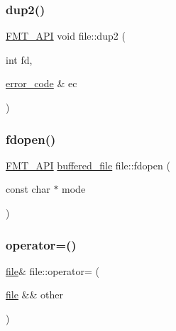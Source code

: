 \mbox{\label{classfile_afcd00b59adb3e06540627960832a164c}} 
\subsubsection{\texorpdfstring{dup2()}{dup2()}\hspace{0.1cm}{\footnotesize\ttfamily [2/2]}}
{\footnotesize\ttfamily \hyperlink{core_8h_a9a4960b70582ed2620911a0b75dce0b5}{F\+M\+T\+\_\+\+A\+PI} void file\+::dup2 (\begin{DoxyParamCaption}\item[{int}]{fd,  }\item[{\hyperlink{classerror__code}{error\+\_\+code} \&}]{ec }\end{DoxyParamCaption})}

\mbox{\label{classfile_a8e6b39b08670ce61993ee23acfe36c80}} 
\subsubsection{\texorpdfstring{fdopen()}{fdopen()}}
{\footnotesize\ttfamily \hyperlink{core_8h_a9a4960b70582ed2620911a0b75dce0b5}{F\+M\+T\+\_\+\+A\+PI} \hyperlink{classbuffered__file}{buffered\+\_\+file} file\+::fdopen (\begin{DoxyParamCaption}\item[{const char $\ast$}]{mode }\end{DoxyParamCaption})}

\mbox{\label{classfile_a2e4cddc680ac231d6386bcef58f4ce03}} 
\subsubsection{\texorpdfstring{operator=()}{operator=()}}
{\footnotesize\ttfamily \hyperlink{classfile}{file}\& file\+::operator= (\begin{DoxyParamCaption}\item[{\hyperlink{classfile}{file} \&\&}]{other }\end{DoxyParamCaption})\hspace{0.3cm}{\ttfamily [inline]}}



